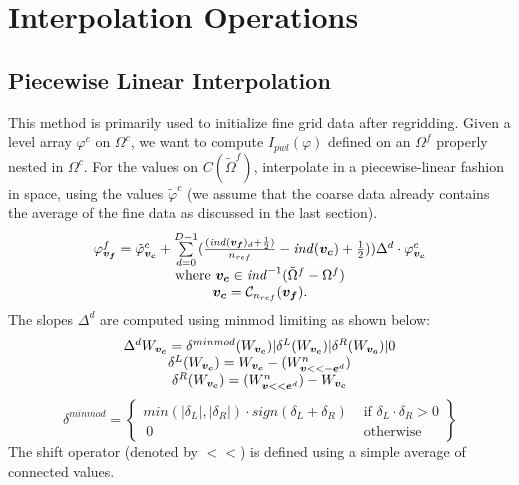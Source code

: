\section{Interpolation Operations}      

\subsection{Piecewise Linear Interpolation}
\label{sec::pwlinearinterp}
This method is primarily used to initialize fine grid data after
regridding. Given a level array $\varphi^c$ on $\Omega^c$, we want to 
compute  $I_{pwl}({\varphi})$ defined on an $\Omega^f$ properly nested
in $\Omega^c$.  
For the values on $C(\tilde{\Omega}^f)$, interpolate in a
piecewise-linear fashion in space, using the values
$\tilde{\varphi}^c$ (we assume that the coarse data already contains
the average of the fine data as discussed in the last section).
\begin{equation}
\begin{array}{c}
\varphi^f_{{\boldsymbol{v_f}}} = \tilde{\varphi}^c_{{\boldsymbol{v_c}}} +
\sum\limits^{D-1}_{d=0}(\frac{({\it ind}({\boldsymbol{v_f}})_d + \frac{1}{2})}{n_{ref}} -
{\it ind}({\boldsymbol{v_c}}) + \frac{1}{2}))\Delta^d \cdot \varphi^c_{{\boldsymbol{v_c}}} \\
\mbox{where } {\boldsymbol{v_c}} \in {\it ind}^{-1}(\tilde{\Omega}^f - \Omega^f) \\
{\boldsymbol{v_c}} = \mathcal{C}_{n_{ref}}({\boldsymbol{v_f}}).
\label{eqn::uberpwlinterp}
\end{array}
\end{equation}
The slopes $\Delta^d$ are computed using minmod limiting as shown below:
\begin{equation}
\begin{array}{c}
\Delta^d W_{{\boldsymbol{v_c}}} = \delta^{minmod}(W_{{\boldsymbol{v_c}}})|
\delta^L(W_{{\boldsymbol{v_c}}})| \delta^R(W_{{\boldsymbol{v_c}}})| 0 \\
\delta^L(W_{{\boldsymbol{v_c}}}) = W_{{\boldsymbol{v_c}}} - (W^n_{{\boldsymbol{v}} <<-{\boldsymbol{e}}^d}) \\
\delta^R(W_{{\boldsymbol{v_c}}}) =(W^n_{{\boldsymbol{v}} << {\boldsymbol{e}}^d}) - W_{{\boldsymbol{v_c}}} \\
\end{array}
\end{equation}
\begin{equation}
\delta^{minmod} = \left\{ \begin{array}{ll} 
         min(|\delta_L|, |\delta_R|) \cdot sign(\delta_L +
\delta_R)  & \mbox{ if } \delta_L \cdot \delta_R > 0 \\
  ~0 & \mbox{ otherwise} 
\end{array}        \right\}
\label{eqn::deltaminmod}
\end{equation}
The shift operator (denoted by $<<$) 
is defined using a simple average of connected values.


